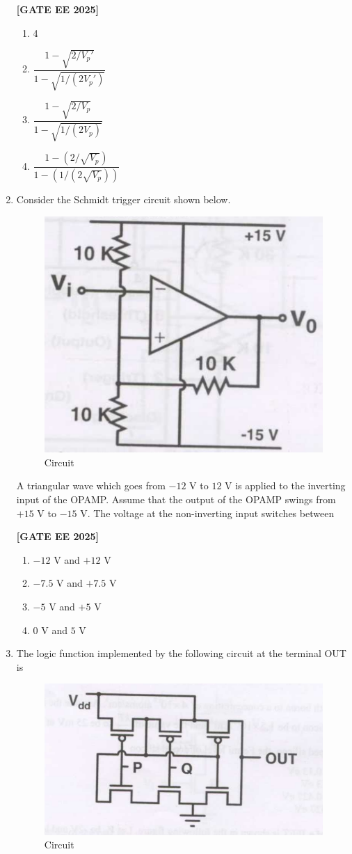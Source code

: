 \documentclass[12pt]{article}
\begin{document}
\begin{enumerate}[leftmargin=*, label=\textbf{Q.\arabic*:}]
\noindent \textbf{[GATE EE 2025]}
\begin{multicols}{2}
\begin{enumerate}
    \item 4
    \item $\dfrac{1 - \sqrt{2/V_p'}}{1 - \sqrt{1/(2V_p')}}$
    \item $\dfrac{1 - \sqrt{2/V_p}}{1 - \sqrt{1/(2V_p)}}$
    \item $\dfrac{1 - (2/\sqrt{V_p})}{1 - (1/(2\sqrt{V_p}))}$
\end{enumerate}
\end{multicols}

\item Consider the Schmidt trigger circuit shown below.

\begin{figure}[H]\centering
\includegraphics[width=0.5\columnwidth]{figs/q53.png}
\caption{Circuit}
\label{fig:q53}
\end{figure}

A triangular wave which goes from $-12$ V to $12$ V is applied to the inverting input of the OPAMP. Assume that the output of the OPAMP swings from $+15$ V to $-15$ V. The voltage at the non-inverting input switches between
 
\noindent \textbf{[GATE EE 2025]}
\begin{multicols}{2}
\begin{enumerate}
    \item $-12$ V and $+12$ V
    \item $-7.5$ V and $+7.5$ V
    \item $-5$ V and $+5$ V
    \item $0$ V and $5$ V
\end{enumerate}
\end{multicols}

\item The logic function implemented by the following circuit at the terminal OUT is
\begin{figure}[H]\centering
\includegraphics[width=0.6\columnwidth]{figs/q54.png}
\caption{Circuit}
\label{fig:q54}
\end{figure}
 

\end{enumerate}
\end{document}
